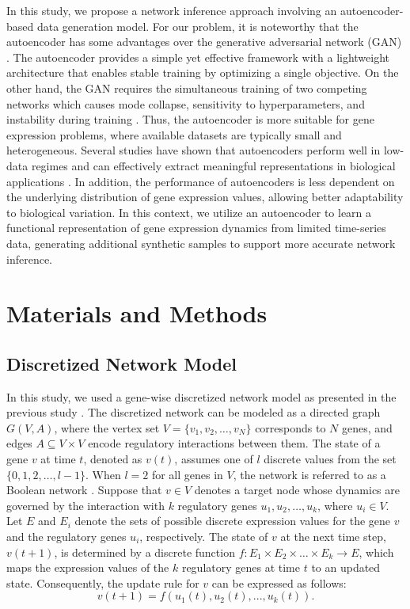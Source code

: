 In this study, we propose a network inference approach involving an autoencoder-based data generation model. For our problem, it is noteworthy that the autoencoder has some advantages over the generative adversarial network (GAN) \parencite{Goodfellow2020}. The autoencoder provides a simple yet effective framework with a lightweight architecture that enables stable training by optimizing a single objective. On the other hand, the GAN requires the simultaneous training of two competing networks which causes mode collapse, sensitivity to hyperparameters, and instability during training \parencite{Arjovsky2017, Salimans2016}. Thus, the autoencoder is more suitable for gene expression problems, where available datasets are typically small and heterogeneous. Several studies have shown that autoencoders perform well in low-data regimes and can effectively extract meaningful representations in biological applications \parencite{Tan2015, Chen2016}. In addition, the performance of autoencoders is less dependent on the underlying distribution of gene expression values, allowing better adaptability to biological variation. In this context, we utilize an autoencoder to learn a functional representation of gene expression dynamics from limited time-series data, generating additional synthetic samples to support more accurate network inference.
\section{Materials and Methods}

\subsection{Discretized Network Model}\label{sub:discretized}
In this study, we used a gene-wise discretized network model as presented in the previous study \parencite{anh2023mutual}. The discretized network can be modeled as a directed graph \( G(V, A) \), where the vertex set \( V = \{v_1, v_2, \dots, v_N\} \) corresponds to \( N \) genes, and edges \( A \subseteq V \times V \) encode regulatory interactions between them. The state of a gene \( v \) at time \( t \), denoted as \( v(t) \), assumes one of \( l \) discrete values from the set \( \{0, 1, 2, \dots, l - 1\} \). When \( l = 2 \) for all genes in \( V \), the network is referred to as a Boolean network \parencite{Kauffman1971}. Suppose that \( v \in V \) denotes a target node whose dynamics are governed by the interaction with \(k\) regulatory genes \( u_1, u_2, \dots, u_k \), where \( u_i \in V \). Let \( E \) and \( E_i \) denote the sets of possible discrete expression values for the gene \( v \) and the regulatory genes \( u_i \), respectively. The state of \( v \) at the next time step, \( v(t + 1) \), is determined by a discrete function \( f: E_1 \times E_2 \times \dots \times E_k \to E \), which maps the expression values of the \(k\) regulatory genes at time \( t \) to an updated state. Consequently, the update rule for \( v \) can be expressed as follows:
\[ v(t+1) = f(u_1(t), u_2(t), ..., u_k(t)). \tag{1} \label{eq: special}\] 

